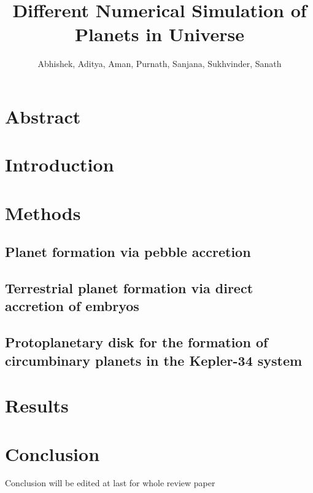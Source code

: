 \documentclass[12pt, a4paper]{article}
\title{Different Numerical Simulation of Planets in Universe}
\author{Abhishek, Aditya, Aman, Purnath, Sanjana, Sukhvinder, Sanath }
\begin{document}
\maketitle


\tableofcontents

\section{Abstract}



\section{Introduction}








\newpage
\section{Methods}

\subsection{Planet formation via pebble accretion}

\subsection{Terrestrial planet formation via direct accretion of embryos}

\subsection{Protoplanetary disk for the formation of circumbinary planets in the Kepler-34 system}



\section{Results}





\section{Conclusion}
Conclusion will be edited at last for whole review paper



\printbibliography
\end{document}
